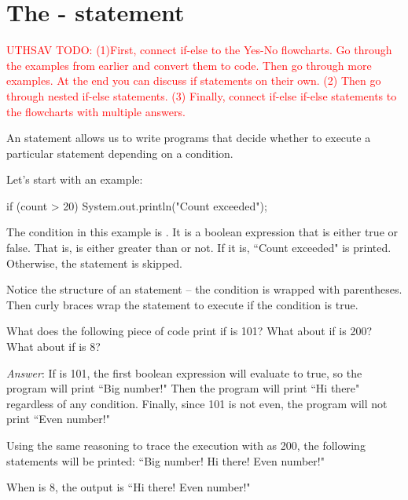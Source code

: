 \section{The - statement}

\textcolor{red}{UTHSAV TODO: (1)First, connect if-else to the Yes-No flowcharts. Go through the examples from earlier and convert them to code. Then go through more examples. At the end you can discuss if statements on their own.
(2) Then go through nested if-else statements.
(3) Finally, connect if-else if-else statements to the flowcharts with multiple answers.
}

\begin{definition}
An  statement allows us to write programs that decide whether to execute a particular statement depending on a condition.
\end{definition}

Let's start with an example:

\begin{code}
if (count > 20) {
    System.out.println("Count exceeded");
}
\end{code}

The condition in this example is . It is a boolean expression that is either true or false. That is,  is either greater than  or not. If it is, ``Count exceeded" is printed. Otherwise, the  statement is skipped.

Notice the structure of an  statement -- the condition is wrapped with parentheses. Then curly braces wrap the statement to execute if the condition is true.

\begin{example}
What does the following piece of code print if  is 101? What about if  is 200? What about if  is 8?


\emph{Answer}: If  is 101, the first boolean expression will evaluate to true, so the program will print ``Big number!" Then the program will print ``Hi there" regardless of any condition. Finally, since 101 is not even, the program will not print ``Even number!"

Using the same reasoning to trace the execution with  as 200, the following statements will be printed: ``Big number! Hi there! Even number!"

When  is 8, the output is ``Hi there! Even number!"
\end{example}

